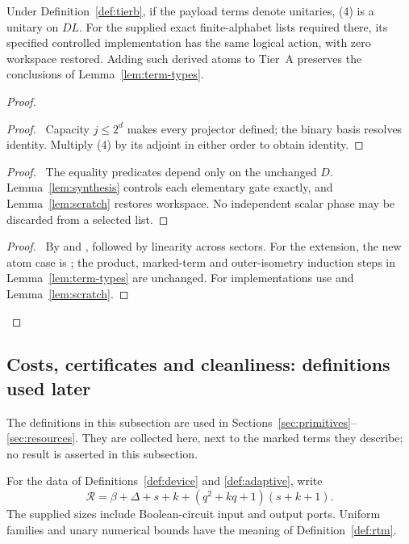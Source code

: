 \begin{lemma}\label{lem:menu}
Under Definition~\ref{def:tierb}, if the payload terms denote unitaries,
(4) is a unitary on $DL$. For the supplied exact finite-alphabet lists
required there, its specified controlled implementation has the same
logical action, with zero workspace restored. Adding such derived atoms
to Tier~A preserves the conclusions of Lemma~\ref{lem:term-types}.
\end{lemma}
\begin{proof}
 \begin{proof}\pf\ Capacity $j\leq2^d$ makes every projector defined;
 the binary basis resolves identity. Multiply (4) by its adjoint in
 either order to obtain identity.\end{proof}
 \begin{proof}\pf\ The equality predicates depend only on the
 unchanged $D$. Lemma~\ref{lem:synthesis} controls each elementary
 gate exactly, and Lemma~\ref{lem:scratch} restores workspace. No
 independent scalar phase may be discarded from a selected list.\end{proof}
 \qedstep
 \begin{proof}\pf\ By  and
 , followed by linearity across sectors.
 For the extension, the new atom case is ;
 the product, marked-term and outer-isometry induction steps in
 Lemma~\ref{lem:term-types} are unchanged. For implementations use
  and Lemma~\ref{lem:scratch}.
 \end{proof}
\end{proof}

\subsection{Costs, certificates and cleanliness: definitions used later}
The definitions in this subsection are used in Sections~\ref{sec:primitives}--%
\ref{sec:resources}. They are collected here, next to the marked terms they
describe; no result is asserted in this subsection.

\begin{definition}\label{def:selection-cost}
For the data of Definitions~\ref{def:device} and \ref{def:adaptive}, write
\[
\mathcal R=\beta+\Delta+s+k+(q^2+kq+1)(s+k+1).
\]
The supplied sizes include Boolean-circuit input and output ports. Uniform families and unary numerical bounds have the meaning of Definition~\ref{def:rtm}.
\end{definition}

